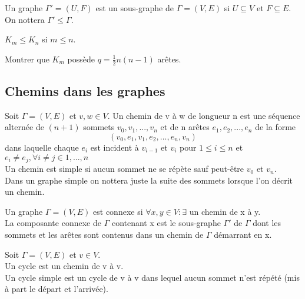 \begin{defn}
Un graphe ${\Gamma}'=(U,F)$ est un sous-graphe de $\Gamma=(V,E)$ si $ U \subseteq V$ et $F \subseteq E$. On nottera $ {\Gamma}' \leq \Gamma$.
\end{defn}

\begin{exmp}
$ K_{m} \leq K_{n}$ si $ m \leq n$.
\end{exmp}

\begin{exo}
Montrer que $K_{m}$ possède $ q=\frac{1}{2}n(n-1)$ arêtes.
\end{exo}


\subsection{Chemins dans les graphes}

\begin{defn}
Soit $\Gamma = (V,E)$ et $v,w \in V$. Un chemin de v à w de longueur n est une séquence alternée de $(n+1)$ sommets $v_{0},v_{1},...,v_{n}$ et de n arêtes $e_{1},e_{2},...,e_{n}$ de la forme $$ (v_{0},e_{1},v_{1},e_{2},...,e_{n},v_{n})$$ dans laquelle chaque $e_{i}$ est incident à $v_{i-1}$ et $v_{i}$ pour $1 \leq i \leq n$ et $ e_{i} \neq e_{j} , \forall i \neq j \in 1,...,n$ \\

Un chemin est simple si aucun sommet ne se répète sauf peut-être $v_{0}$ et $v_{n}$. \\

Dans un graphe simple on nottera juste la suite des sommets lorsque l'on décrit un chemin. \\

\end{defn}

\begin{defn}
Un graphe $\Gamma = (V,E)$ est connexe si $\forall x,y \in V : \exists $ un chemin de x à y. \\

La composante connexe de $\Gamma$ contenant x est le sous-graphe ${\Gamma}'$ de $\Gamma$ dont les sommets et les arêtes sont contenus dans un chemin de $\Gamma$ démarrant en x. \\
\end{defn}

\begin{defn}
Soit $\Gamma = (V,E)$ et $v \in V$.\\

Un cycle est un chemin de v à v.\\

Un cycle simple est un cycle de v à v dans lequel aucun sommet n'est répété (mis à part le départ et l'arrivée).\\
\end{defn}

